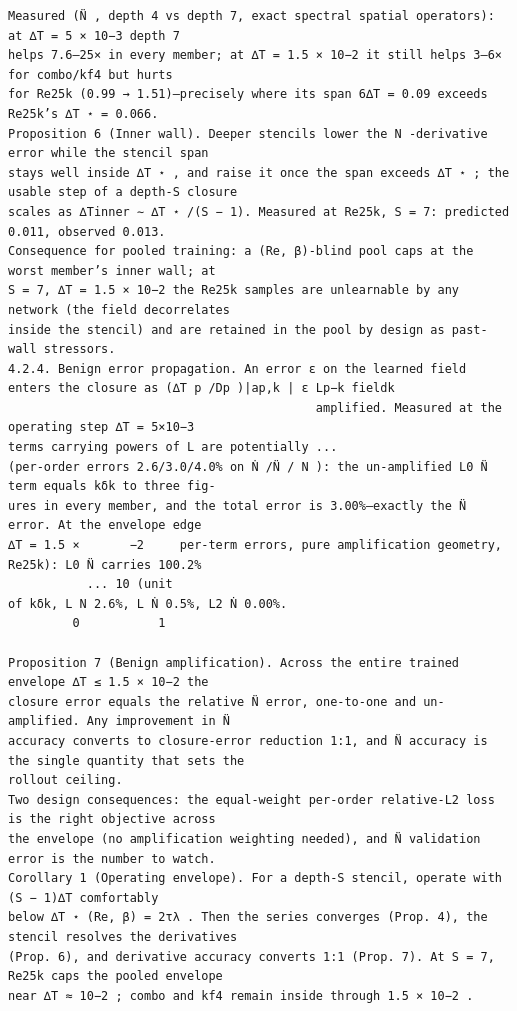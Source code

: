 \documentclass[letterpaper]{article}
\begin{document}
\begin{Verbatim}[fontsize=\fontsize{6.35}{7.15}\selectfont,breaklines=false]
Measured (N̈ , depth 4 vs depth 7, exact spectral spatial operators): at ∆T = 5 × 10−3 depth 7
helps 7.6–25× in every member; at ∆T = 1.5 × 10−2 it still helps 3–6× for combo/kf4 but hurts
for Re25k (0.99 → 1.51)—precisely where its span 6∆T = 0.09 exceeds Re25k’s ∆T ⋆ = 0.066.
Proposition 6 (Inner wall). Deeper stencils lower the N -derivative error while the stencil span
stays well inside ∆T ⋆ , and raise it once the span exceeds ∆T ⋆ ; the usable step of a depth-S closure
scales as ∆Tinner ∼ ∆T ⋆ /(S − 1). Measured at Re25k, S = 7: predicted 0.011, observed 0.013.
Consequence for pooled training: a (Re, β)-blind pool caps at the worst member’s inner wall; at
S = 7, ∆T = 1.5 × 10−2 the Re25k samples are unlearnable by any network (the field decorrelates
inside the stencil) and are retained in the pool by design as past-wall stressors.
4.2.4. Benign error propagation. An error ε on the learned field enters the closure as (∆T p /Dp )|ap,k | ε Lp−k fieldk
                                           amplified. Measured at the operating step ∆T = 5×10−3
terms carrying powers of L are potentially ...
(per-order errors 2.6/3.0/4.0% on Ṅ /N̈ / N ): the un-amplified L0 N̈ term equals kδk to three fig-
ures in every member, and the total error is 3.00%—exactly the N̈ error. At the envelope edge
∆T = 1.5 ×       −2     per-term errors, pure amplification geometry, Re25k): L0 N̈ carries 100.2%
           ... 10 (unit
of kδk, L N 2.6%, L Ṅ 0.5%, L2 Ṅ 0.00%.
         0           1

Proposition 7 (Benign amplification). Across the entire trained envelope ∆T ≤ 1.5 × 10−2 the
closure error equals the relative N̈ error, one-to-one and un-amplified. Any improvement in N̈
accuracy converts to closure-error reduction 1:1, and N̈ accuracy is the single quantity that sets the
rollout ceiling.
Two design consequences: the equal-weight per-order relative-L2 loss is the right objective across
the envelope (no amplification weighting needed), and N̈ validation error is the number to watch.
Corollary 1 (Operating envelope). For a depth-S stencil, operate with (S − 1)∆T comfortably
below ∆T ⋆ (Re, β) = 2τλ . Then the series converges (Prop. 4), the stencil resolves the derivatives
(Prop. 6), and derivative accuracy converts 1:1 (Prop. 7). At S = 7, Re25k caps the pooled envelope
near ∆T ≈ 10−2 ; combo and kf4 remain inside through 1.5 × 10−2 .


\end{Verbatim}
\end{document}
